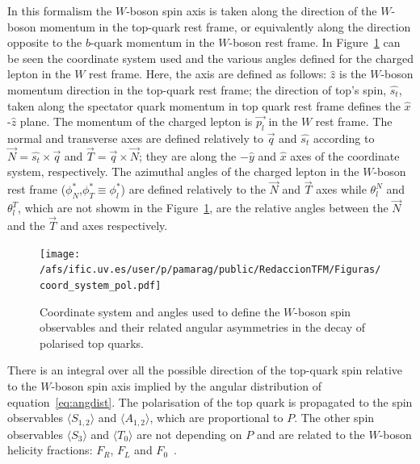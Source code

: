 In this formalism the $W$-boson spin axis is taken along the direction of the $W$-boson momentum in the top-quark rest frame, or equivalently along the direction opposite to the $b$-quark momentum in the $W$-boson rest frame. In Figure~\ref{Fig:CoordSyst} can be seen the coordinate system used and the various angles defined for the charged lepton in the $W$ rest frame.  Here, the axis are defined as follows: $\hat{z}$ is the $W$-boson momentum direction in the top-quark rest frame; the direction of top's spin, $\hat{s_t}$, taken along the spectator quark momentum in top quark rest frame defines the $\hat{x}$-$\hat{z}$ plane. The momentum of the charged lepton is $\overrightarrow{p_l}$ in the $W$ rest frame. The normal and transverse axes are defined relatively to $\overrightarrow{q}$ and $\hat{s_t}$ according to $\overrightarrow{N}= \hat{s_t} \times \overrightarrow{q}$ and $\overrightarrow{T}= \overrightarrow{q} \times \overrightarrow{N}$; they are along the $-\hat{y}$ and $\hat{x}$ axes of the coordinate system, respectively. The azimuthal angles of the charged lepton in the $W$-boson rest frame ($\phi_N^{*}$,$\phi_T^{*} \equiv \phi_l^{*}$) are defined relatively to the $\overrightarrow{N}$ and $\overrightarrow{T}$ axes while $\theta_l^{N}$ and $\theta_l^{T}$, which are not showm in the Figure~\ref{Fig:CoordSyst}, are the relative angles between the $\overrightarrow{N}$ and the $\overrightarrow{T}$ and axes respectively.

\begin{figure}[htb]
\centering
\texttt{[image: /afs/ific.uv.es/user/p/pamarag/public/RedaccionTFM/Figuras/coord\_system\_pol.pdf]}
\caption{Coordinate system and angles used to define the $W$-boson spin observables and their related angular asymmetries in the decay of polarised top quarks.}
\label{Fig:CoordSyst}
\end{figure}

There is an integral over all the possible direction of the top-quark spin relative to the $W$-boson spin axis implied by the angular distribution of equation~\eqref{eq:angdist}. The polarisation of the top quark is propagated to the spin observables $\langle S_{1, 2} \rangle$ and $\langle A_{1, 2} \rangle$, which are proportional to $P$. The other spin observables $\langle S_{3} \rangle$ and $\langle T_{0} \rangle$ are not depending on $P$ and are related to the $W$-boson helicity fractions: $F_R$, $F_L$ and $F_0$~\cite{Aguilar-Saavedra:2015yza}.


